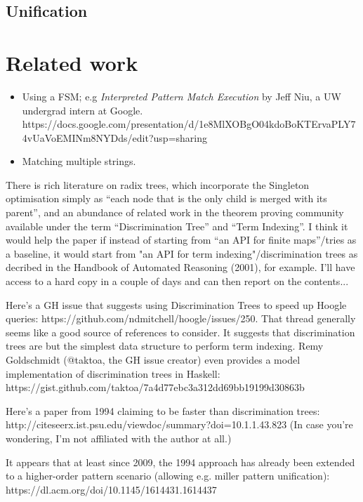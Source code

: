 \documentclass[acmsmall]{acmart}
\theoremstyle{theorem}
\theoremstyle{definition}
\theoremstyle{remark}
\begin{document}
\subsection{Unification}

\section{Related work}

\begin{itemize}
\item Using a FSM; e.g \emph{Interpreted Pattern Match Execution} by Jeff Niu, a UW undergrad intern at Google.  https://docs.google.com/presentation/d/1e8MlXOBgO04kdoBoKTErvaPLY74vUaVoEMINm8NYDds/edit?usp=sharing

\item Matching multiple strings.
\end{itemize}

There is rich literature on radix trees, which incorporate the Singleton optimisation simply as ``each node that is the only child is merged with its parent'', and an abundance of related work in the theorem proving community available under the term ``Discrimination Tree'' and ``Term Indexing''. I think it would help the paper if instead of starting from ``an API for finite maps''/tries as a baseline, it would start from "an API for term indexing"/discrimination trees as decribed in the Handbook of Automated Reasoning (2001), for example. I'll have access to a hard copy in a couple of days and can then report on the contents...

Here's a GH issue that suggests using Discrimination Trees to speed up Hoogle queries: https://github.com/ndmitchell/hoogle/issues/250. That thread generally seems like a good source of references to consider. It suggests that discrimination trees are but the simplest data structure to perform term indexing.
Remy Goldschmidt (@taktoa, the GH issue creator) even provides a model implementation of discrimination trees in Haskell: https://gist.github.com/taktoa/7a4d77ebc3a312dd69bb19199d30863b

Here's a paper from 1994 claiming to be faster than discrimination trees: http://citeseerx.ist.psu.edu/viewdoc/summary?doi=10.1.1.43.823 (In case you're wondering, I'm not affiliated with the author at all.)

It appears that at least since 2009, the 1994 approach has already been extended to a higher-order pattern scenario (allowing e.g. miller pattern unification): https://dl.acm.org/doi/10.1145/1614431.1614437
\end{document}
